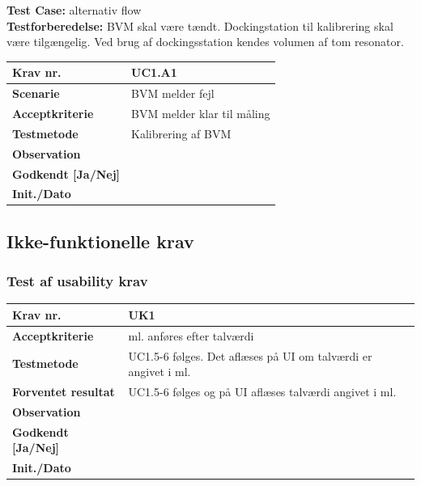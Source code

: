 		
\pagebreak
\textbf{Test Case:} alternativ flow\\
\textbf{Testforberedelse:} BVM skal være tændt. Dockingstation til kalibrering skal være tilgængelig. Ved brug af dockingsstation kendes volumen af tom resonator. \\


\begin{tabularx}{1\textwidth}{|l|X|}
\hline
\textbf{Krav nr.}              & UC1.A1  \\ \hline
\textbf{Scenarie}              & BVM melder fejl  \\ \hline
\textbf{Acceptkriterie}        & BVM melder klar til måling\\ \hline
\textbf{Testmetode}            & Kalibrering af BVM \\ \hline
\textbf{Observation}           &  \\ \hline
\textbf{Godkendt {[}Ja/Nej{]}} &  \\ \hline
\textbf{Init./Dato}            &  \\ \hline
\end{tabularx}




\subsection{Ikke-funktionelle krav}

\vspace{5mm}

\subsubsection{Test af usability krav}

\begin{tabularx}{1\textwidth}{|l|X|}
\hline
\textbf{Krav nr.}              & UK1  \\ \hline
\textbf{Acceptkriterie}        & ml. anføres efter talværdi \\ \hline
\textbf{Testmetode}            & UC1.5-6 følges. Det aflæses på UI om talværdi er angivet i ml.  \\ \hline
\textbf{Forventet resultat}	& UC1.5-6 følges og på UI aflæses talværdi angivet i ml. \\ \hline
\textbf{Observation}           &  \\ \hline
\textbf{Godkendt {[}Ja/Nej{]}} &  \\ \hline
\textbf{Init./Dato}            &  \\ \hline
\end{tabularx}

